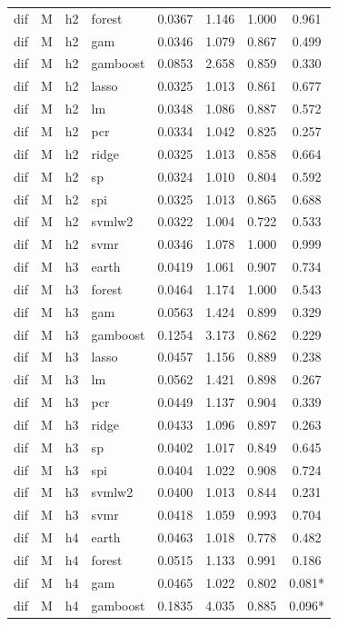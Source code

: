 \begin{ThreePartTable}
\begin{longtable}[t]{llclcccc}
dif & M & h2 & forest & 0.0367 & 1.146 & 1.000 & 0.961\\
dif & M & h2 & gam & 0.0346 & 1.079 & 0.867 & 0.499\\
dif & M & h2 & gamboost & 0.0853 & 2.658 & 0.859 & 0.330\\
dif & M & h2 & lasso & 0.0325 & 1.013 & 0.861 & 0.677\\
dif & M & h2 & lm & 0.0348 & 1.086 & 0.887 & 0.572\\
dif & M & h2 & pcr & 0.0334 & 1.042 & 0.825 & 0.257\\
dif & M & h2 & ridge & 0.0325 & 1.013 & 0.858 & 0.664\\
dif & M & h2 & sp & 0.0324 & 1.010 & 0.804 & 0.592\\
dif & M & h2 & spi & 0.0325 & 1.013 & 0.865 & 0.688\\
dif & M & h2 & svmlw2 & 0.0322 & 1.004 & 0.722 & 0.533\\
dif & M & h2 & svmr & 0.0346 & 1.078 & 1.000 & 0.999\\
\addlinespace
dif & M & h3 & earth & 0.0419 & 1.061 & 0.907 & 0.734\\
dif & M & h3 & forest & 0.0464 & 1.174 & 1.000 & 0.543\\
dif & M & h3 & gam & 0.0563 & 1.424 & 0.899 & 0.329\\
dif & M & h3 & gamboost & 0.1254 & 3.173 & 0.862 & 0.229\\
dif & M & h3 & lasso & 0.0457 & 1.156 & 0.889 & 0.238\\
dif & M & h3 & lm & 0.0562 & 1.421 & 0.898 & 0.267\\
dif & M & h3 & pcr & 0.0449 & 1.137 & 0.904 & 0.339\\
dif & M & h3 & ridge & 0.0433 & 1.096 & 0.897 & 0.263\\
dif & M & h3 & sp & 0.0402 & 1.017 & 0.849 & 0.645\\
dif & M & h3 & spi & 0.0404 & 1.022 & 0.908 & 0.724\\
dif & M & h3 & svmlw2 & 0.0400 & 1.013 & 0.844 & 0.231\\
dif & M & h3 & svmr & 0.0418 & 1.059 & 0.993 & 0.704\\
\addlinespace
dif & M & h4 & earth & 0.0463 & 1.018 & 0.778 & 0.482\\
dif & M & h4 & forest & 0.0515 & 1.133 & 0.991 & 0.186\\
dif & M & h4 & gam & 0.0465 & 1.022 & 0.802 & 0.081*\\
dif & M & h4 & gamboost & 0.1835 & 4.035 & 0.885 & 0.096*\\

\end{longtable}
\end{ThreePartTable}
